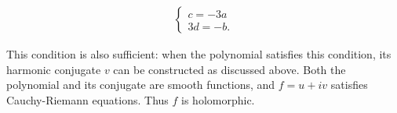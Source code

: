\documentclass{article}
\begin{document}
\begin{align*}
	\begin{cases}
		c=-3a \\
		3d=-b.
	\end{cases}
\end{align*}

This condition is also sufficient: when the polynomial satisfies this condition, its harmonic conjugate $v$ can be constructed as discussed above. Both the polynomial and its conjugate are smooth functions, and $f=u+iv$ satisfies Cauchy-Riemann equations. Thus $f$ is holomorphic.
\end{document}
